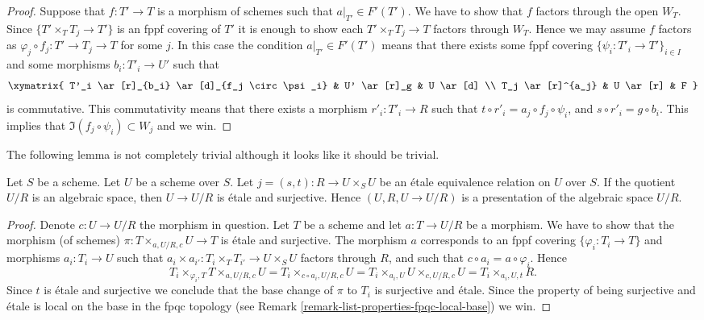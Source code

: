 \begin{proof}
\medskip\noindent
Suppose that $f : T' \to T$ is a morphism of schemes
such that $a|_{T'} \in F'(T')$. We have to show that
$f$ factors through the open $W_T$. Since
$\{T' \times_T T_j \to T'\}$ is an fppf covering of $T'$
it is enough to show each $T' \times_T T_j \to T$
factors through $W_T$. Hence we may assume $f$ factors
as $\varphi_j \circ f_j : T' \to T_j \to T$ for some $j$.
In this case the condition $a|_{T'} \in F'(T')$ means that there exists
some fppf covering $\{\psi_i : T'_i \to T'\}_{i \in I}$ and some
morphisms $b_i : T'_i \to U'$ such that
$$
\xymatrix{
T'_i \ar[r]_{b_i} \ar[d]_{f_j \circ \psi_i} & U' \ar[r]_g & U \ar[d] \\
T_j \ar[r]^{a_j} & U \ar[r] & F
}
$$
is commutative. This commutativity means that there exists a
morphism $r'_i : T'_i \to R$ such that
$t \circ r'_i = a_j \circ f_j \circ \psi_i$, and
$s \circ r'_i = g \circ b_i$. This implies that
$\Im(f_j \circ \psi_i) \subset W_j$ and we win.
\end{proof}

\noindent
The following lemma is not completely trivial although it looks
like it should be trivial.

\begin{lemma}
\label{lemma-when-it-works-it-works}
Let $S$ be a scheme. Let $U$ be a scheme over $S$.
Let $j = (s, t) : R \to U \times_S U$
be an \'etale equivalence relation on $U$ over $S$.
If the quotient $U/R$ is an algebraic space, then
$U \to U/R$ is \'etale and surjective. Hence
$(U, R, U \to U/R)$ is a presentation of the algebraic
space $U/R$.
\end{lemma}

\begin{proof}
Denote $c : U \to U/R$ the morphism in question.
Let $T$ be a scheme and let $a : T \to U/R$ be a morphism.
We have to show that the morphism (of schemes)
$\pi : T \times_{a, U/R, c} U \to T$ is \'etale and surjective.
The morphism $a$ corresponds to an fppf covering
$\{\varphi_i : T_i \to T\}$ and morphisms $a_i : T_i \to U$ such
that
$a_i \times a_{i'} : T_i \times_T T_{i'} \to U \times_S U$
factors through $R$, and such that $c \circ a_i = a \circ \varphi_i$.
Hence
$$
T_i \times_{\varphi_i, T} T \times_{a, U/R, c} U =
T_i \times_{c \circ a_i, U/R, c} U =
T_i \times_{a_i, U} U \times_{c, U/R, c} U = T_i \times_{a_i, U, t} R.
$$
Since $t$ is \'etale and surjective we conclude that
the base change of $\pi$ to $T_i$ is surjective and \'etale.
Since the property of being surjective and \'etale is local
on the base in the fpqc topology (see
Remark \ref{remark-list-properties-fpqc-local-base})
we win.
\end{proof}

